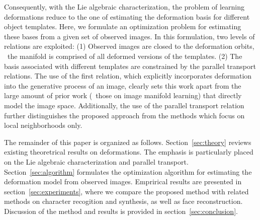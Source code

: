 Consequently, with the Lie algebraic characterization, the problem of learning
deformations reduce to the one of estimating the deformation basis
for different object templates. Here, we formulate an optimization problem
for estimating these bases from a given set of observed images. In
this formulation, two levels of relations are exploited:
(1) Observed images are closed to the deformation orbits, \ie~the
manifold is comprised of all deformed versions of the templates. 
(2) The basis associated with different templates are constrained by
the parallel transport relations.
The use of the first relation, which explicitly incorporates
deformation into the generative process of an image, clearly sets this
work apart from the large amount of prior work (\eg~those on image
manifold learning) that directly model the image space. Additionally,
the use of the parallel transport relation further distinguishes the
proposed approach from the methods which focus on local
neighborhoods only.

The remainder of this paper is organized as follows.
Section~\ref{sec:theory} reviews existing theoretrical results on deformations. The
emphasis is particularly placed on the Lie algebraic characterization
and parallel transport.
Section~\ref{sec:algorithm} formulates the optimization algorithm
for estimating the deformation model from observed images.
Emprirical results are presented in section~\ref{sec:experiments}, where we
compare the proposed method with related methods on character
recogition and synthesis, as well as face reconstruction.
Discussion of the method and results is provided in section~\ref{sec:conclusion}. 


